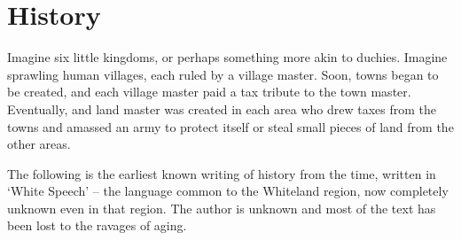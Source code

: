\chapter{History}


Imagine six little kingdoms, or perhaps something more akin to duchies.  Imagine sprawling human villages, each ruled by a village master.  Soon, towns began to be created, and each village master paid a tax tribute to the town master.  Eventually, and land master was created in each area who drew taxes from the towns and amassed an army to protect itself or steal small pieces of land from the other areas.

	The following is the earliest known writing of history from the time, written in `White Speech' -- the language common to the Whiteland region, now completely unknown even in that region.  The author is unknown and most of the text has been lost to the ravages of aging.


